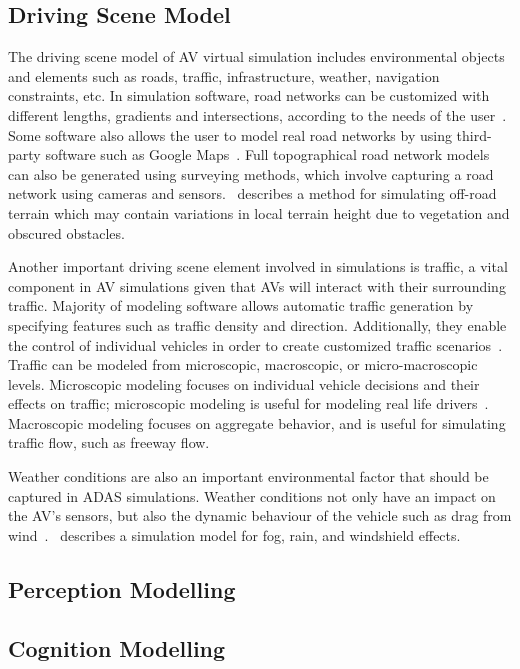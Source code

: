 \documentclass{article}
\begin{document}
\subsection{Driving Scene Model}

The driving scene model of AV virtual simulation includes environmental objects and elements such as roads, traffic, infrastructure, weather, navigation constraints, etc. In simulation software, road networks can be customized with different lengths, gradients and intersections, according to the needs of the user~\cite{Amimi2017}. Some software also allows the user to model real road networks by using  third-party software such as Google Maps~\cite{Olofsson2015}. Full topographical road network models can also be generated using surveying methods, which involve capturing a road network using cameras and sensors.~\cite{Wellington2006} describes a method for simulating off-road terrain which may contain variations in local terrain height due to vegetation and obscured obstacles.
 
Another important driving scene element involved in simulations is traffic, a vital component in AV simulations given that AVs will interact with their surrounding traffic. Majority of modeling software allows automatic traffic generation by specifying features such as traffic density and direction. Additionally, they enable the control of individual vehicles in order to create customized traffic scenarios~\cite{Olofsson2015}. Traffic can be modeled from microscopic, macroscopic, or micro-macroscopic levels. Microscopic modeling focuses on individual vehicle decisions and their effects on traffic; microscopic modeling is useful for modeling real life drivers~\cite{Xu2011}. Macroscopic modeling focuses on aggregate behavior, and is useful for simulating traffic flow, such as freeway flow.
 
Weather conditions are also an important environmental factor that should be captured in ADAS simulations. Weather conditions not only have an impact on the AV’s sensors, but also the dynamic behaviour of the vehicle such as drag from wind~\cite{Amimi2017}.~\cite{Praveen2017} describes a simulation model for fog, rain, and windshield effects.


\subsection{Perception Modelling}

\subsection{Cognition Modelling}
\end{document}
